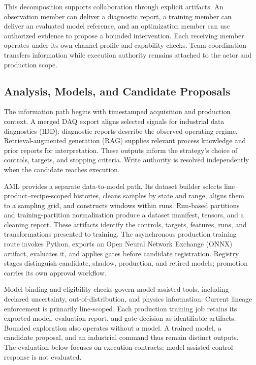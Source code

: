 This decomposition supports collaboration through explicit artifacts. An
observation member can deliver a diagnostic report, a training member can
deliver an evaluated model reference, and an optimization member can use
authorized evidence to propose a bounded intervention. Each receiving
member operates under its own channel profile and capability checks. Team
coordination transfers information while execution authority remains
attached to the actor and production scope.

\subsection{Analysis, Models, and Candidate Proposals}
The information path begins with timestamped acquisition and production
context. A merged DAQ export aligns selected signals for industrial data
diagnostics (IDD); diagnostic reports describe the observed operating
regime. Retrieval-augmented generation (RAG) supplies relevant process
knowledge and prior reports for interpretation. These outputs inform the
strategy's choice of controls, targets, and stopping criteria. Write
authority is resolved independently when the candidate reaches execution.

AML provides a separate data-to-model path. Its dataset builder selects
line--product--recipe-scoped histories, cleans samples by state and range,
aligns them to a sampling grid, and constructs windows within runs.
Run-based partitions and training-partition normalization produce a
dataset manifest, tensors, and a cleaning report. These artifacts identify
the controls, targets, features, runs, and transformations presented to
training. The asynchronous production training route invokes Python,
exports an Open Neural Network Exchange (ONNX) artifact, evaluates it, and
applies gates before candidate registration. Registry stages distinguish
candidate, shadow, production, and retired models; promotion carries its
own approval workflow.

Model binding and eligibility checks govern model-assisted tools, including
declared uncertainty, out-of-distribution, and physics information. Current
lineage enforcement is primarily line-scoped. Each production training job
retains its exported model, evaluation report, and gate decision as
identifiable artifacts. Bounded exploration also operates without a model.
A trained model, a candidate proposal, and an industrial command thus remain
distinct outputs. The evaluation below focuses on execution contracts;
model-assisted control--response is not evaluated.

